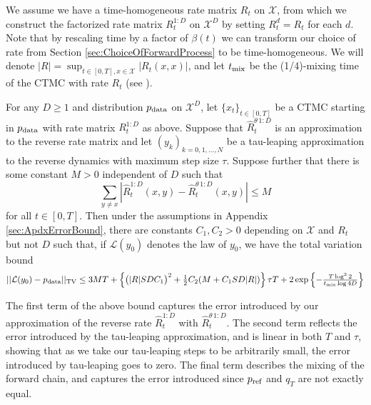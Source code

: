 \documentclass{article}
\begin{document}
We assume we have a time-homogeneous rate matrix $R_t$ on $\mathcal{X}$, from which we construct the factorized rate matrix $R_t^{1:D}$ on $\mathcal{X}^D$ by setting $R^d_t = R_t$ for each $d$. Note that by rescaling time by a factor of $\beta(t)$ we can transform our choice of rate from Section \ref{sec:ChoiceOfForwardProcess} to be time-homogeneous. We will denote $|R| = \sup_{t \in [0,T], x \in \mathcal{X}} |R_t(x,x)|$, and let $t_{\textup{mix}}$ be the (1/4)-mixing time of the CTMC with rate $R_t$ (see \cite[Chapter 4.5]{levin2009markovchains}).

\begin{theorem}
\label{thm:error_bound}
For any $D \geq 1$ and distribution $p_{\textup{data}}$ on $\mathcal{X}^D$, let $\{x_t\}_{t \in [0,T]}$ be a CTMC starting in $p_{\textup{data}}$ with rate matrix $R^{1:D}_t$ as above. Suppose that $\hat{R}_t^{\theta \, 1:D}$ is an approximation to the reverse rate matrix and let $(y_k)_{k = 0, 1, \dots, N}$ be a tau-leaping approximation to the reverse dynamics with maximum step size $\tau$. Suppose further that there is some constant $M > 0$ independent of $D$ such that
\begin{equation}
\label{eq:error_bound_condition}
    \sum_{y \neq x} \left| \hat R_t^{1:D}(x,y) - \hat{R}_t^{\theta \, 1:D}(x,y) \right| \leq M
\end{equation}
for all $t \in [0,T]$. Then under the assumptions in Appendix \ref{sec:ApdxErrorBound}, there are constants $C_1, C_2 > 0$ depending on $\mathcal{X}$ and $R_t$ but not $D$ such that, if $\mathcal{L}(y_0)$ denotes the law of $y_0$, we have the total variation bound
\begin{equation}
\textstyle
    ||\mathcal{L}(y_0) - p_{\textup{data}}||_{\textup{TV}} \leq 3MT + \left\{ \big(|R|SDC_1\big)^2 + \frac{1}{2} C_2(M + C_1 SD|R|) \right\} \tau T + 2 \exp \left \{ - \frac{T \log^2 2}{t_{\textup{mix}} \log 4D} \right \}
\end{equation}
\end{theorem}

The first term of the above bound captures the error introduced by our approximation of the reverse rate $\hat R_t^{1:D}$ with $\hat{R}_t^{\theta \, 1:D}$. The second term reflects the error introduced by the tau-leaping approximation, and is linear in both $T$ and $\tau$, showing that as we take our tau-leaping steps to be arbitrarily small, the error introduced by tau-leaping goes to zero. The final term describes the mixing of the forward chain, and captures the error introduced since $p_{\textup{ref}}$ and $q_T$ are not exactly equal.
\end{document}
